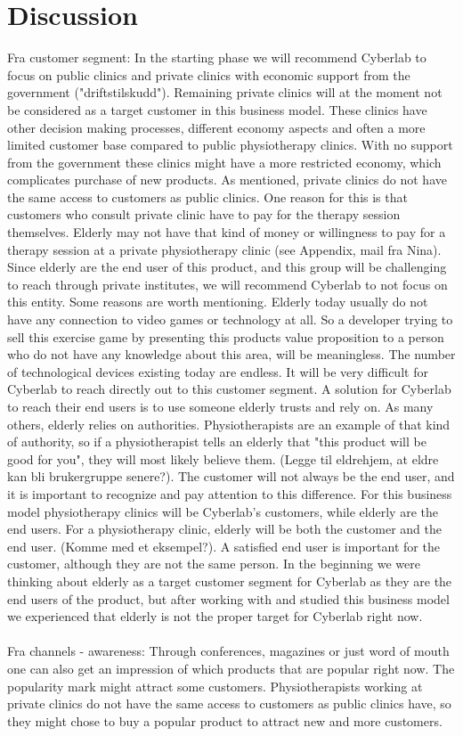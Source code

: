 \section{Discussion}
Fra customer segment: In the starting phase we will recommend Cyberlab to focus on public clinics and private clinics with economic support from the government ("driftstilskudd"). Remaining private clinics will at the moment not be considered as a target customer in this business model. These clinics have other decision making processes, different economy aspects and often a more limited customer base compared to public physiotherapy clinics. With no support from the government these clinics might have a more restricted economy, which complicates purchase of new products. As mentioned, private clinics do not have the same access to customers as public clinics. One reason for this is that customers who consult private clinic have to pay for the therapy session themselves. Elderly may not have that kind of money or willingness to pay for a therapy session at a private physiotherapy clinic (see Appendix, mail fra Nina). Since elderly are the end user of this product, and this group will be challenging to reach through private institutes, we will recommend Cyberlab to not focus on this entity. Some reasons are worth mentioning. Elderly today usually do not have any connection to video games or technology at all. So a developer trying to sell this exercise game by presenting this products value proposition to a person who do not have any knowledge about this area, will be meaningless. The number of technological devices existing today are endless. It will be very difficult for Cyberlab to reach directly out to this customer segment. A solution for Cyberlab to reach their end users is to use someone elderly trusts and rely on. As many others, elderly relies on authorities. Physiotherapists are an example of that kind of authority, so if a physiotherapist tells an elderly that "this product will be good for you", they will most likely believe them. (Legge til eldrehjem, at eldre kan bli brukergruppe senere?). The customer will not always be the end user, and it is important to recognize and pay attention to this difference. For this business model physiotherapy clinics will be Cyberlab's customers, while elderly are the end users. For a physiotherapy clinic, elderly will be both the customer and the end user. (Komme med et eksempel?). A satisfied end user is important for the customer, although they are not the same person. In the beginning we were thinking about elderly as a target customer segment for Cyberlab as they are the end users of the product, but after working with and studied this business model we experienced that elderly is not the proper target for Cyberlab right now. \\ \\
Fra channels - awareness: Through conferences, magazines or just word of mouth one can also get an impression of which products that are popular right now. The popularity mark might attract some customers. Physiotherapists working at private clinics do not have the same access to customers as public clinics have, so they might chose to buy a popular product to attract new and more customers.  